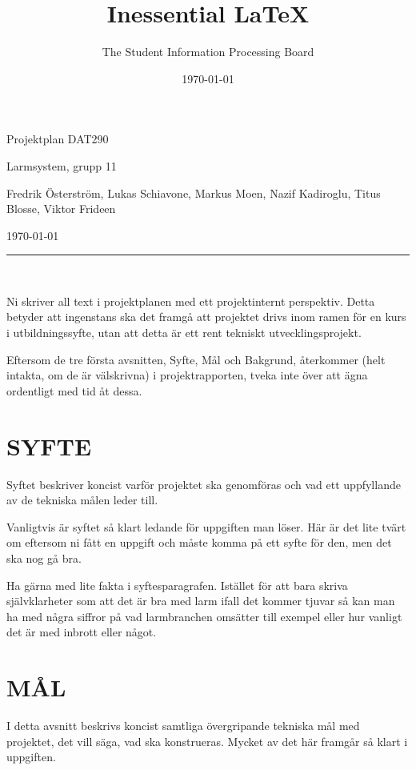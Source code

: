 \documentclass[a4paper]{article}
\begin{document}
\begin{center}
\thispagestyle{empty}
\parskip=14pt%

\title{Inessential \LaTeX{}}
\author{The Student Information Processing Board}
\date{\today}
\vspace*{3\parskip}%

{\LARGE Projektplan DAT290}

{\large Larmsystem, grupp 11

Fredrik Österström, Lukas Schiavone, Markus Moen, Nazif Kadiroglu, Titus Blosse, Viktor Frideen

\today}


\rule{7cm}{0.4pt}\\
\end{center}


\tableofcontents


Ni skriver all text i projektplanen med ett projektinternt perspektiv.
Detta betyder att ingenstans ska det framgå att projektet drivs inom
ramen för en kurs i utbildningssyfte, utan att detta är ett rent
tekniskt utvecklingsprojekt.

Eftersom de tre första avsnitten, Syfte, Mål och Bakgrund, återkommer
(helt intakta, om de är välskrivna) i projektrapporten, tveka inte över
att ägna ordentligt med tid åt dessa.



\section{SYFTE}


Syftet beskriver koncist varför projektet ska genomföras och vad ett
uppfyllande av de tekniska målen leder till.

Vanligtvis är syftet så klart ledande för uppgiften man löser. Här är
det lite tvärt om eftersom ni fått en uppgift och måste komma på ett
syfte för den, men det ska nog gå bra.

Ha gärna med lite fakta i syftesparagrafen. Istället för att bara skriva
självklarheter som att det är bra med larm ifall det kommer tjuvar så
kan man ha med några siffror på vad larmbranchen omsätter till exempel
eller hur vanligt det är med inbrott eller något.


\section{MÅL}



I detta avsnitt beskrivs koncist samtliga övergripande tekniska mål med
projektet, det vill säga, vad ska konstrueras. Mycket av det här
framgår så klart i uppgiften.
\end{document}
